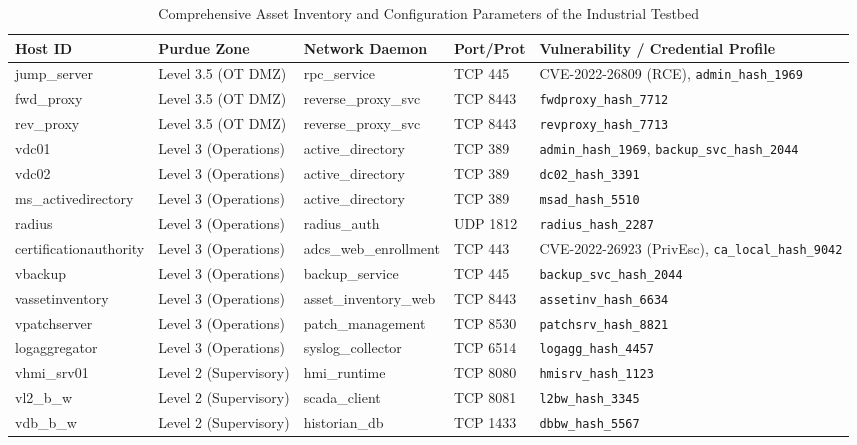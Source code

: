 \documentclass[target=mst,aauheader=aics,style=]{thud}
\begin{document}
\begin{table}[htbp]
\centering
\scriptsize
\caption{Comprehensive Asset Inventory and Configuration Parameters of the Industrial Testbed}
\label{tab:testbed_inventory}
\begin{tabularx}{\textwidth}{>{\ttfamily}p{2.6cm} p{2.2cm} >{\ttfamily}p{2.3cm} p{1.6cm} X}
\toprule
\textrm{\textbf{Host ID}} & \textbf{Purdue Zone} & \textrm{\textbf{Network Daemon}} & \textbf{Port/Prot} & \textbf{Vulnerability / Credential Profile} \\
\midrule
jump\_server & Level 3.5 (OT DMZ) & rpc\_service & TCP 445 & CVE-2022-26809 (RCE), \texttt{admin\_hash\_1969} \\
fwd\_proxy & Level 3.5 (OT DMZ) & reverse\_proxy\_svc & TCP 8443 & \texttt{fwdproxy\_hash\_7712} \\
rev\_proxy & Level 3.5 (OT DMZ) & reverse\_proxy\_svc & TCP 8443 & \texttt{revproxy\_hash\_7713} \\
vdc01 & Level 3 (Operations) & active\_directory & TCP 389 & \texttt{admin\_hash\_1969}, \texttt{backup\_svc\_hash\_2044} \\
vdc02 & Level 3 (Operations) & active\_directory & TCP 389 & \texttt{dc02\_hash\_3391} \\
ms\_activedirectory & Level 3 (Operations) & active\_directory & TCP 389 & \texttt{msad\_hash\_5510} \\
radius & Level 3 (Operations) & radius\_auth & UDP 1812 & \texttt{radius\_hash\_2287} \\
certificationauthority & Level 3 (Operations) & adcs\_web\_enrollment & TCP 443 & CVE-2022-26923 (PrivEsc), \texttt{ca\_local\_hash\_9042} \\
vbackup & Level 3 (Operations) & backup\_service & TCP 445 & \texttt{backup\_svc\_hash\_2044} \\
vassetinventory & Level 3 (Operations) & asset\_inventory\_web & TCP 8443 & \texttt{assetinv\_hash\_6634} \\
vpatchserver & Level 3 (Operations) & patch\_management & TCP 8530 & \texttt{patchsrv\_hash\_8821} \\
logaggregator & Level 3 (Operations) & syslog\_collector & TCP 6514 & \texttt{logagg\_hash\_4457} \\
vhmi\_srv01 & Level 2 (Supervisory) & hmi\_runtime & TCP 8080 & \texttt{hmisrv\_hash\_1123} \\
vl2\_b\_w & Level 2 (Supervisory) & scada\_client & TCP 8081 & \texttt{l2bw\_hash\_3345} \\
vdb\_b\_w & Level 2 (Supervisory) & historian\_db & TCP 1433 & \texttt{dbbw\_hash\_5567} \\

\end{tabularx}
\end{table}
\end{document}
